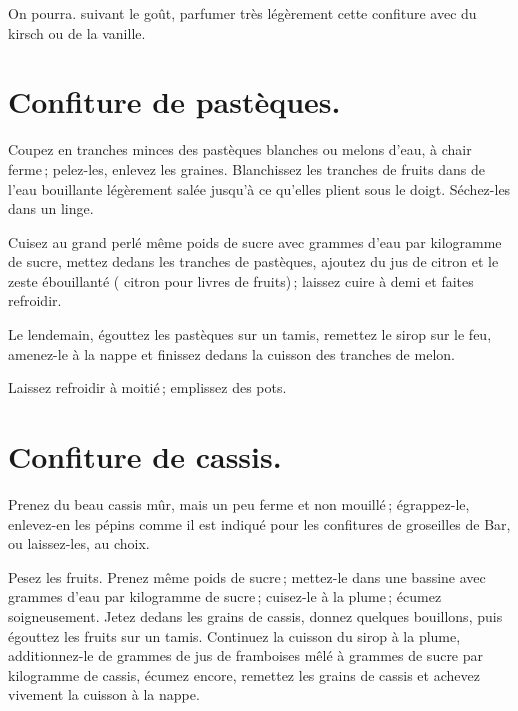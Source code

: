 \medskip

On pourra. suivant le goût, parfumer très légèrement cette confiture avec du
kirsch ou de la vanille.

\section*{\centering Confiture de pastèques.}
{}

Coupez en tranches minces des pastèques blanches ou melons d'eau, à chair
ferme ; pelez-les, enlevez les graines. Blanchissez les tranches de fruits dans
de l'eau bouillante légèrement salée jusqu'à ce qu'elles plient sous le doigt.
Séchez-les dans un linge.

Cuisez au grand perlé même poids de sucre avec {\mmm} grammes d’eau par
kilogramme de sucre, mettez dedans les tranches de pastèques, ajoutez du jus de
citron et le zeste ébouillanté ({\mmm} citron pour {\mmm} livres de
fruits) ; laissez cuire à demi et faites refroidir.

Le lendemain, égouttez les pastèques sur un tamis, remettez le sirop sur le
feu, amenez-le à la nappe et finissez dedans la cuisson des tranches de melon.

Laissez refroidir à moitié ; emplissez des pots.

\section*{\centering Confiture de cassis.}
{}

Prenez du beau cassis mûr, mais un peu ferme et non mouillé ; égrappez-le,
enlevez-en les pépins comme il est indiqué pour les confitures de groseilles de
Bar, ou laissez-les, au choix.

Pesez les fruits. Prenez même poids de sucre ; mettez-le dans une bassine avec
{\mmm} grammes d'eau par kilogramme de sucre ; cuisez-le à la plume ;
écumez soigneusement. Jetez dedans les grains de cassis, donnez quelques
bouillons, puis égouttez les fruits sur un tamis. Continuez la cuisson du sirop
à la plume, additionnez-le de {\mmm} grammes de jus de framboises mêlé
à {\mmm} grammes de sucre par kilogramme de cassis, écumez encore,
remettez les grains de cassis et achevez vivement la cuisson à la nappe.

